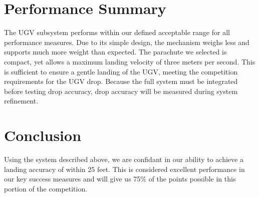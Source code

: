\documentclass[]{auvsi_doc}
\begin{document}
\section{Performance Summary}
The UGV subsystem performs within our defined acceptable range for all performance measures.
Due to its simple design, the mechanism weighs less and supports much more weight than expected. 
The parachute we selected is compact, yet allows a maximum landing velocity of three meters per second. This is sufficient to ensure a gentle landing of the UGV, meeting the competition requirements for the UGV drop. Because the full system must be integrated before testing drop accuracy, drop accuracy will be measured during system refinement.

\section{Conclusion}
Using the system described above, we are confidant in our ability to achieve a landing accuracy of within 25 feet. This is considered excellent performance in our key success measures and will give us 75\% of the points possible in this portion of the competition. 
\end{document}
